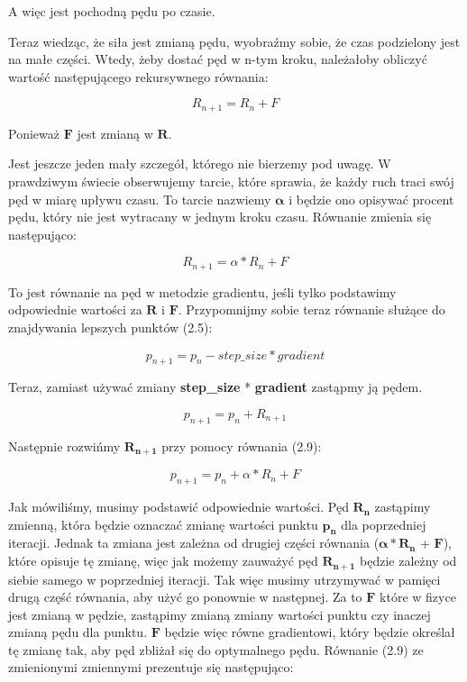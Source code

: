 \noindent A więc jest pochodną pędu po czasie.\newline

\noindent Teraz wiedząc, że siła jest zmianą pędu, wyobraźmy sobie, że czas podzielony jest na małe części. Wtedy, żeby dostać pęd w n-tym kroku, należałoby obliczyć wartość następującego rekursywnego równania:

\begin{equation}
R_{n+1} = R_{n} + F
\end{equation}

\noindent Ponieważ $\boldsymbol{F}$ jest zmianą w $\boldsymbol{R}$.\newline

\noindent Jest jeszcze jeden mały szczegół, którego nie bierzemy pod uwagę. W prawdziwym świecie obserwujemy tarcie, które sprawia, że każdy ruch traci swój pęd w miarę upływu czasu. To tarcie nazwiemy $\boldsymbol{\alpha}$ i będzie ono opisywać procent pędu, który nie jest wytracany w jednym kroku czasu. Równanie zmienia się następująco:

\begin{equation}
R_{n+1} = \alpha * R_{n} + F
\end{equation}

\noindent To jest równanie na pęd w metodzie gradientu, jeśli tylko podstawimy odpowiednie wartości za $\boldsymbol{R}$ i $\boldsymbol{F}$. Przypomnijmy sobie teraz równanie służące do znajdywania lepszych punktów (2.5):

\begin{equation}
p_{n+1} = p_{n} - step\_size * gradient
\end{equation}

\noindent Teraz, zamiast używać zmiany \textbf{step\_size} * \textbf{gradient} zastąpmy ją pędem.

\begin{equation}
p_{n+1} = p_{n} + R_{n+1}
\end{equation}

\noindent Następnie rozwińmy $\boldsymbol{R_{n+1}}$ przy pomocy równania (2.9):

\begin{equation}
p_{n+1} = p_{n} + \alpha * R_{n} + F
\end{equation}

Jak mówiliśmy, musimy podstawić odpowiednie wartości. Pęd $\boldsymbol{R_n}$ zastąpimy zmienną, która będzie oznaczać zmianę wartości punktu $\boldsymbol{p_n}$ dla poprzedniej iteracji. Jednak ta zmiana jest zależna od drugiej części równania ($\boldsymbol{\alpha} * \boldsymbol{R_n}$ + $\boldsymbol{F}$), które opisuje tę zmianę, więc jak możemy zauważyć pęd $\boldsymbol{R_{n+1}}$ będzie zależny od siebie samego w poprzedniej iteracji. Tak więc musimy utrzymywać w pamięci drugą część równania, aby użyć go ponownie w następnej. Za to $\boldsymbol{F}$ które w fizyce jest zmianą w pędzie, zastąpimy zmianą zmiany wartości punktu czy inaczej zmianą pędu dla punktu. $\boldsymbol{F}$ będzie więc równe gradientowi, który będzie określał tę zmianę tak, aby pęd zbliżał się do optymalnego pędu. Równanie (2.9) ze zmienionymi zmiennymi prezentuje się następująco:

